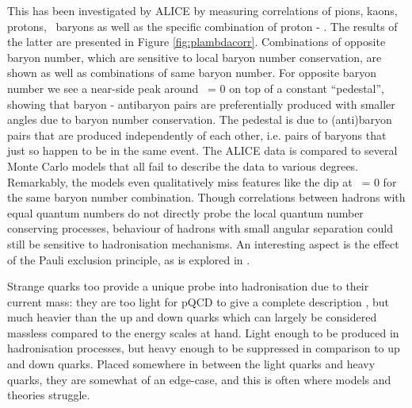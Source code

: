     This has been investigated by ALICE by measuring correlations of pions, kaons, protons, \Lambda\ baryons as well as the specific combination of proton - \Lambda.\cite{ALICEppCorr} The results of the latter are presented in Figure \ref{fig:plambdacorr}. Combinations of opposite baryon number, which are sensitive to local baryon number conservation, are shown as well as combinations of same baryon number. For opposite baryon number we see a near-side peak around \dphi\ = 0 on top of a constant ``pedestal'', showing that baryon - antibaryon pairs are preferentially produced with smaller angles due to baryon number conservation. The pedestal is due to (anti)baryon pairs that are produced independently of each other, i.e. pairs of baryons that just so happen to be in the same event. The ALICE data is compared to several Monte Carlo models that all fail to describe the data to various degrees. Remarkably, the models even qualitatively miss features like the dip at \dphi\ = 0 for the same baryon number combination. Though correlations between hadrons with equal quantum numbers do not directly probe the local quantum number conserving processes, behaviour of hadrons with small angular separation could still be sensitive to hadronisation mechanisms. An interesting aspect is the effect of the Pauli exclusion principle, as is explored in \cite{PYTHIA8Pauli}. 

    Strange quarks too provide a unique probe into hadronisation due to their current mass: they are too light for pQCD to give a complete description
    , but much heavier than the up and down quarks which can largely be considered massless compared to the energy scales at hand. Light enough to be produced in hadronisation processes, but heavy enough to be suppressed in comparison to up and down quarks. Placed somewhere in between the light quarks and heavy quarks, they are somewhat of an edge-case, and this is often where models and theories struggle. 

